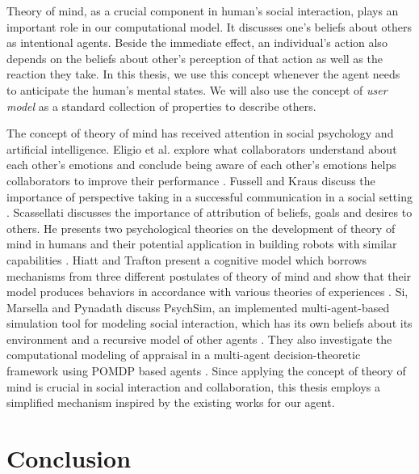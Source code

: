 \documentclass[12pt]{report}
\begin{document}
Theory of mind, as a crucial component in human's social interaction, plays an
important role in our computational model. It discusses one's beliefs about
others as intentional agents. Beside the immediate effect, an individual's
action also depends on the beliefs about other's perception of that action as
well as the reaction they take. In this thesis, we use this concept whenever the
agent needs to anticipate the human's mental states. We will also use the concept
of \textit{user model} as a standard collection of properties to describe
others.

The concept of theory of mind has received attention in social psychology and
artificial intelligence. Eligio et al. explore what collaborators understand
about each other's emotions and conclude being aware of each other's emotions
helps collaborators to improve their performance
\cite{eligio:emotion-understanding-collaboration}. Fussell and Kraus discuss the
importance of perspective taking in a successful communication in a social
setting \cite{fussell:knowledge-coordination-communication}. Scassellati
discusses the importance of attribution of beliefs, goals and desires to others.
He presents two psychological theories on the development of theory of mind in
humans and their potential application in building robots with similar
capabilities \cite{scassellati:tom-humanoid-robot}. Hiatt and Trafton present a
cognitive model which borrows mechanisms from three different postulates of
theory of mind and show that their model produces behaviors in accordance with
various theories of experiences \cite{hiatt:cognitive-model-tom}. Si, Marsella
and Pynadath discuss PsychSim, an implemented multi-agent-based simulation tool
for modeling social interaction, which has its own beliefs about its environment
and a recursive model of other agents \cite{pynadath:modeling-tom-appraisal}.
They also investigate the computational modeling of appraisal in a multi-agent
decision-theoretic framework using POMDP based agents
\cite{si:modeling-appraisal-tom, si:modeling-appraisal-tom-journal}. Since
applying the concept of theory of mind is crucial in social interaction and
collaboration, this thesis employs a simplified mechanism inspired by the
existing works for our agent.

\section{Conclusion}
\end{document}
